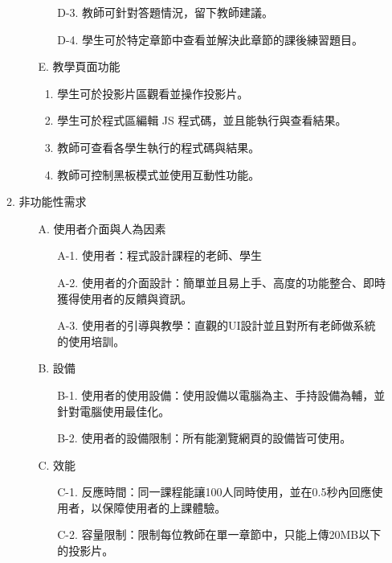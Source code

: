 \documentclass[12pt]{article}
\begin{document}
\begin{enumerate}
\begin{enumerate}
\begin{enumerate}[itemindent=12pt]
\begin{enumerate}[itemindent=24pt]
              \item [D-3.] 教師可針對答題情況，留下教師建議。
              \item [D-4.] 學生可於特定章節中查看並解決此章節的課後練習題目。
            \end{enumerate}
          \item [E.] 教學頁面功能
            \begin{enumerate}[itemindent=24pt, label=E-\arabic*.]
              \item 學生可於投影片區觀看並操作投影片。
              \item 學生可於程式區編輯 JS 程式碼，並且能執行與查看結果。
              \item 教師可查看各學生執行的程式碼與結果。
              \item 教師可控制黑板模式並使用互動性功能。
            \end{enumerate}
          \end{enumerate}
      \item 非功能性需求
        \begin{enumerate}[itemindent=12pt]
          \item [A.] 使用者介面與人為因素
          \begin{enumerate}[itemindent=24pt]
            \item [A-1.] 使用者：程式設計課程的老師、學生
            \item [A-2.] 使用者的介面設計：簡單並且易上手、高度的功能整合、即時獲得使用者的反饋與資訊。
            \item [A-3.] 使用者的引導與教學：直觀的UI設計並且對所有老師做系統的使用培訓。
          \end{enumerate}
          \item [B.] 設備
            \begin{enumerate}[itemindent=24pt]
              \item [B-1.] 使用者的使用設備：使用設備以電腦為主、手持設備為輔，並針對電腦使用最佳化。
              \item [B-2.] 使用者的設備限制：所有能瀏覽網頁的設備皆可使用。
            \end{enumerate}
          \item [C.] 效能
            \begin{enumerate}[itemindent=24pt]
              \item [C-1.] 反應時間：同一課程能讓100人同時使用，並在0.5秒內回應使用者，以保障使用者的上課體驗。
              \item [C-2.] 容量限制：限制每位教師在單一章節中，只能上傳20MB以下的投影片。

\end{enumerate}
\end{enumerate}
\end{enumerate}
\end{enumerate}
\end{document}
